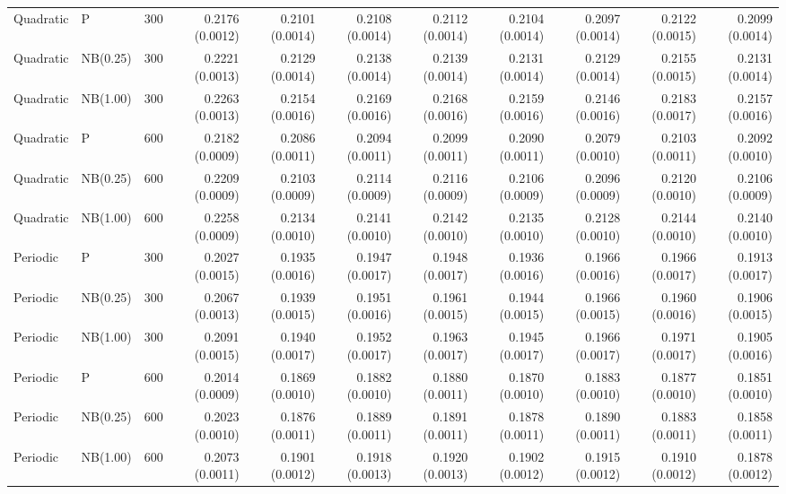 \begin{table}[p]
{\begin{tabular}{lllrrrrrrrr}
\hline

Quadratic & P & 300
& 0.2176 (0.0012)
& 0.2101 (0.0014)
& 0.2108 (0.0014)
& 0.2112 (0.0014)
& 0.2104 (0.0014)
& 0.2097 (0.0014)
& 0.2122 (0.0015)
& 0.2099 (0.0014) \\

Quadratic & NB(0.25) & 300
& 0.2221 (0.0013)
& 0.2129 (0.0014)
& 0.2138 (0.0014)
& 0.2139 (0.0014)
& 0.2131 (0.0014)
& 0.2129 (0.0014)
& 0.2155 (0.0015)
& 0.2131 (0.0014) \\

Quadratic & NB(1.00) & 300
& 0.2263 (0.0013)
& 0.2154 (0.0016)
& 0.2169 (0.0016)
& 0.2168 (0.0016)
& 0.2159 (0.0016)
& 0.2146 (0.0016)
& 0.2183 (0.0017)
& 0.2157 (0.0016) \\

Quadratic & P & 600
& 0.2182 (0.0009)
& 0.2086 (0.0011)
& 0.2094 (0.0011)
& 0.2099 (0.0011)
& 0.2090 (0.0011)
& 0.2079 (0.0010)
& 0.2103 (0.0011)
& 0.2092 (0.0010) \\

Quadratic & NB(0.25) & 600
& 0.2209 (0.0009)
& 0.2103 (0.0009)
& 0.2114 (0.0009)
& 0.2116 (0.0009)
& 0.2106 (0.0009)
& 0.2096 (0.0009)
& 0.2120 (0.0010)
& 0.2106 (0.0009) \\

Quadratic & NB(1.00) & 600
& 0.2258 (0.0009)
& 0.2134 (0.0010)
& 0.2141 (0.0010)
& 0.2142 (0.0010)
& 0.2135 (0.0010)
& 0.2128 (0.0010)
& 0.2144 (0.0010)
& 0.2140 (0.0010) \\

\hline

Periodic & P & 300
& 0.2027 (0.0015)
& 0.1935 (0.0016)
& 0.1947 (0.0017)
& 0.1948 (0.0017)
& 0.1936 (0.0016)
& 0.1966 (0.0016)
& 0.1966 (0.0017)
& 0.1913 (0.0017) \\

Periodic & NB(0.25) & 300
& 0.2067 (0.0013)
& 0.1939 (0.0015)
& 0.1951 (0.0016)
& 0.1961 (0.0015)
& 0.1944 (0.0015)
& 0.1966 (0.0015)
& 0.1960 (0.0016)
& 0.1906 (0.0015) \\

Periodic & NB(1.00) & 300
& 0.2091 (0.0015)
& 0.1940 (0.0017)
& 0.1952 (0.0017)
& 0.1963 (0.0017)
& 0.1945 (0.0017)
& 0.1966 (0.0017)
& 0.1971 (0.0017)
& 0.1905 (0.0016) \\

Periodic & P & 600
& 0.2014 (0.0009)
& 0.1869 (0.0010)
& 0.1882 (0.0010)
& 0.1880 (0.0011)
& 0.1870 (0.0010)
& 0.1883 (0.0010)
& 0.1877 (0.0010)
& 0.1851 (0.0010) \\

Periodic & NB(0.25) & 600
& 0.2023 (0.0010)
& 0.1876 (0.0011)
& 0.1889 (0.0011)
& 0.1891 (0.0011)
& 0.1878 (0.0011)
& 0.1890 (0.0011)
& 0.1883 (0.0011)
& 0.1858 (0.0011) \\

Periodic & NB(1.00) & 600
& 0.2073 (0.0011)
& 0.1901 (0.0012)
& 0.1918 (0.0013)
& 0.1920 (0.0013)
& 0.1902 (0.0012)
& 0.1915 (0.0012)
& 0.1910 (0.0012)
& 0.1878 (0.0012) \\

\hline
\end{tabular}%
}
\end{table}
